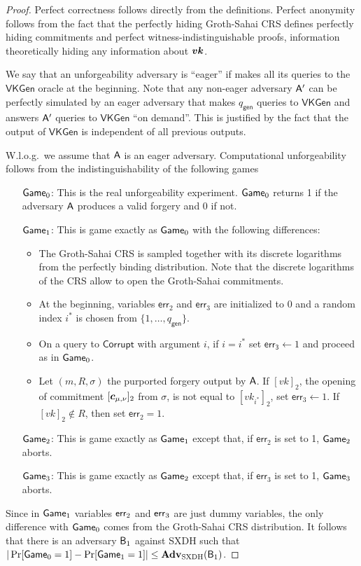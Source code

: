 \begin{proof}
Perfect correctness follows directly from the definitions. Perfect anonymity follows from the fact that the perfectly hiding Groth-Sahai CRS defines perfectly hiding commitments and perfect witness-indistinguishable proofs, information theoretically hiding any information about ${\boldsymbol{vk}}$.

We say that an unforgeability adversary is ``eager'' if  makes all its queries to the $\mathsf{VKGen}$ oracle at the beginning. Note that any non-eager adversary $\mathsf{A}'$ can be perfectly simulated  by an eager adversary that makes ${q_\mathsf{gen}}$ queries to $\mathsf{VKGen}$ and answers $\mathsf{A}'$ queries to $\mathsf{VKGen}$ ``on demand''. This is justified by the fact that the output of $\mathsf{VKGen}$ is independent of all previous outputs.

W.l.o.g.~we assume that $\mathsf{A}$ is an eager adversary. Computational unforgeability follows from the indistinguishability of the following games
\begin{itemize}
\item[$\mathsf{Game}_0$:] This is the real unforgeability experiment. $\mathsf{Game}_0$ returns 1 if the adversary $\mathsf{A}$ produces a valid forgery and 0 if not.
\item[$\mathsf{Game}_1$:] This is game exactly as $\mathsf{Game}_0$ with the following differences: 
    \begin{itemize}
    \item The Groth-Sahai CRS is sampled together with its discrete logarithms from the perfectly binding distribution. Note that the discrete logarithms of the CRS allow to open the Groth-Sahai commitments.
    \item At the beginning, variables $\mathsf{err}_2$ and $\mathsf{err}_3$ are initialized to $0$ and a random index $i^*$ is chosen from $\{1,\ldots, q_\mathsf{gen}\}$.
    \item On a query to $\mathsf{Corrupt}$ with argument $i$, if $i=i^*$ set $\mathsf{err_3}\gets 1$ and proceed as in $\mathsf{Game}_0$.
    \item Let $(m,R,\sigma)$ the purported forgery output by $\mathsf{A}$. If $[vk]_2$, the opening of commitment $[{\boldsymbol{c}}_{\mu,\nu}]_2$ from $\sigma$, is not equal to $[vk_{i^*}]_2$,  set $\mathsf{err}_3\gets 1$. If $[vk]_2\notin R$, then set $\mathsf{err}_2=1$.
    \end{itemize}
\item[$\mathsf{Game}_2$:] This is game exactly as $\mathsf{Game}_1$ except that, if $\mathsf{err}_2$ is set to 1, $\mathsf{Game}_2$ aborts.
\item[$\mathsf{Game}_3$:] This is game exactly as $\mathsf{Game}_2$ except that, if $\mathsf{err}_3$ is set to 1, $\mathsf{Game}_3$ aborts. 
\end{itemize}
Since in $\mathsf{Game}_1$ variables $\mathsf{err}_2$ and $\mathsf{err}_3$ are just dummy variables, the only difference with $\mathsf{Game}_0$ comes from the Groth-Sahai CRS distribution. It follows that there is an adversary $\mathsf{B}_{1}$ against SXDH such that $|\Pr[\mathsf{Game}_0=1]-\Pr[\mathsf{Game}_1=1]|\leq \mathbf{Adv}_{\mathrm{SXDH}}(\mathsf{B}_{1})$.


\end{proof}
